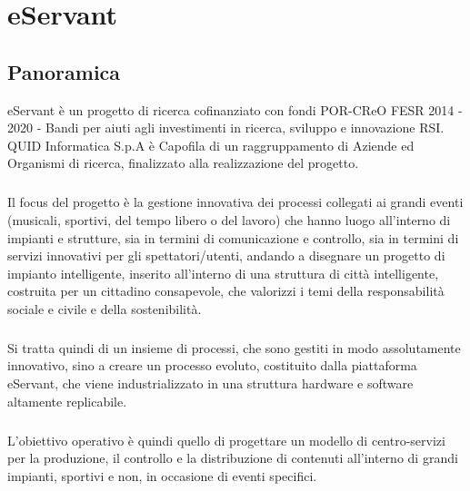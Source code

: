 \chapter{eServant}

\section{Panoramica}
eServant è un progetto di ricerca cofinanziato con fondi POR-CReO FESR 2014 - 2020 - Bandi per aiuti agli investimenti in ricerca, sviluppo e innovazione RSI. QUID Informatica S.p.A è Capofila di un raggruppamento di Aziende ed Organismi di ricerca, finalizzato alla realizzazione del progetto.
\paragraph{}

Il focus del progetto è la gestione innovativa dei processi collegati ai grandi eventi (musicali, sportivi, del tempo libero o del lavoro) che hanno luogo all’interno di impianti e strutture, sia in termini di comunicazione e controllo, sia in termini di servizi innovativi per gli spettatori/utenti, andando a disegnare un progetto di impianto intelligente, inserito all’interno di una struttura di città intelligente, costruita per un cittadino consapevole, che valorizzi i temi della responsabilità sociale e civile e  della sostenibilità.
\paragraph{}

Si tratta quindi di un insieme di processi, che sono gestiti in modo assolutamente innovativo, sino a creare un processo evoluto, costituito dalla piattaforma eServant, che viene industrializzato in una struttura hardware e software altamente replicabile.
\paragraph{}

L’obiettivo operativo è quindi quello di progettare un modello di centro-servizi per la produzione, il controllo e la distribuzione di contenuti all’interno di grandi impianti, sportivi e non, in occasione di eventi specifici.
\paragraph{}

